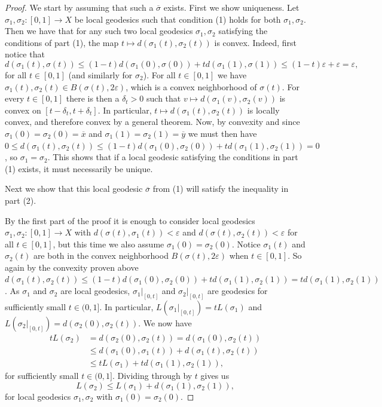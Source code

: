 \documentclass[11pt, a4paper, oneside]{memoir}
\theoremstyle{plain}\newtheorem{theorem}[subsection]{Theorem}
\theoremstyle{definition}
\begin{document}
\begin{proof}
We start by assuming that such a \(\overline{\sigma}\) exists.
First we show uniqueness.
Let \(\sigma_1,\sigma_2:[0,1]\to X\) be local geodesics such that condition (1) holds for both $\sigma_1,\sigma_2$. Then we have that for any such two local geodesics \(\sigma_1,\sigma_2\) satisfying the conditions of part (1), the map \(t\mapsto d(\sigma_1(t),\sigma_2(t))\) is convex. Indeed, first notice that 
$$d(\sigma_1(t),\sigma(t))\leq (1-t)d(\sigma_1(0),\sigma(0))+td(\sigma_1(1),\sigma(1))\leq (1-t)\varepsilon+\varepsilon=\varepsilon,$$ 
for all \(t\in [0,1]\) (and similarly for \(\sigma_2\)).
For all \(t\in [0,1]\) we have \(\sigma_1(t),\sigma_2(t)\in B(\sigma(t),2\varepsilon)\), which is a convex neighborhood of \(\sigma(t)\).
For every \(t\in [0,1]\) there is then a \(\delta_t>0\) such that \(v\mapsto d(\sigma_1(v),\sigma_2(v))\) is convex on \([t-\delta_t,t+\delta_t]\).
In particular, \(t\mapsto d(\sigma_1(t),\sigma_2(t))\) is locally convex, and therefore convex by a general theorem.
Now, by convexity and since \(\sigma_1(0)=\sigma_2(0)=\overline{x}\) and \(\sigma_1(1)=\sigma_2(1)=\overline{y}\) we must then have \(0\leq d(\sigma_1(t),\sigma_2(t))\leq (1-t)d(\sigma_1(0),\sigma_2(0))+td(\sigma_1(1),\sigma_2(1))=0\), so \(\sigma_1=\sigma_2\).
This shows that if a local geodesic satisfying the conditions in part (1) exists, it must necessarily be unique.

\medskip
Next we show that this local geodesic $\overline{\sigma}$ from (1) will satisfy the inequality in part (2).

 By the first part of the proof it is enough to consider local geodesics \(\sigma_1,\sigma_2:[0,1]\to X\) with \(d(\sigma(t),\sigma_1(t))<\varepsilon\) and \(d(\sigma(t),\sigma_2(t))<\varepsilon\) for all \(t\in [0,1]\), but this time we also assume \(\sigma_1(0)=\sigma_2(0)\). Notice 
\(\sigma_1(t)\) and \(\sigma_2(t)\) are both in the convex neighborhood \(B(\sigma(t),2\varepsilon)\) when \(t\in [0,1]\). So again by the convexity proven above \(d(\sigma_1(t),\sigma_2(t))\leq (1-t)d(\sigma_1(0),\sigma_2(0))+td(\sigma_1(1),\sigma_2(1))=td(\sigma_1(1),\sigma_2(1))\).
As \(\sigma_1\) and \(\sigma_2\) are local geodesics, \(\sigma_1|_{[0,t]}\) and \(\sigma_2|_{[0,t]}\) are geodesics for sufficiently small \(t\in (0,1]\).
In particular, \(L(\sigma_1|_{[0,t]})=tL(\sigma_1)\) and \(L(\sigma_2|_{[0,t]})=d(\sigma_2(0),\sigma_2(t))\).
We now have
\begin{align*}
tL(\sigma_2)&=d(\sigma_2(0),\sigma_2(t))=d(\sigma_1(0),\sigma_2(t))\\
            &\leq d(\sigma_1(0),\sigma_1(t))+d(\sigma_1(t),\sigma_2(t))\\
            &\leq tL(\sigma_1)+td(\sigma_1(1),\sigma_2(1)),
\end{align*}
for sufficiently small \(t\in (0,1]\).
Dividing through by \(t\) gives us
\begin{equation}\label{eq:length_ineq}L(\sigma_2)\leq L(\sigma_1)+d(\sigma_1(1),\sigma_2(1)),\end{equation}
for local geodesics \(\sigma_1,\sigma_2\) with \(\sigma_1(0)=\sigma_2(0)\).


\end{proof}
\end{document}

